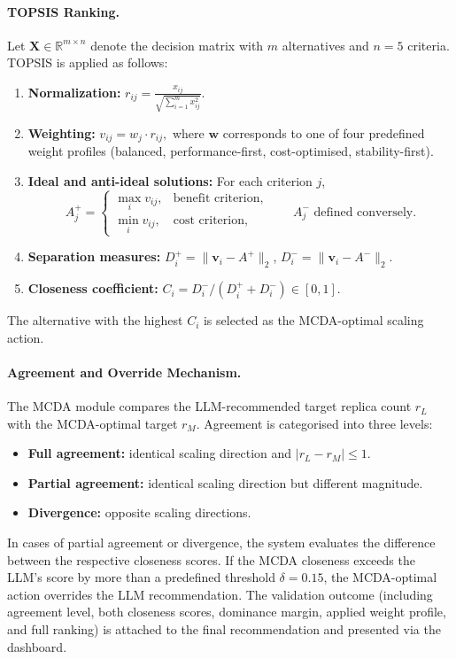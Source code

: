 \documentclass[sigconf]{acmart}
\begin{document}
\paragraph{TOPSIS Ranking.}
Let $\mathbf{X} \in \mathbb{R}^{m \times n}$ denote the decision matrix with $m$ alternatives and $n=5$ criteria. TOPSIS is applied as follows:

\begin{enumerate}
  \item \textbf{Normalization:} $r_{ij} = \frac{x_{ij}}{\sqrt{\sum_{i=1}^{m} x_{ij}^2}}.$
  \item \textbf{Weighting:} $v_{ij} = w_j \cdot r_{ij},$
        where $\mathbf{w}$ corresponds to one of four predefined weight profiles
        (balanced, performance-first, cost-optimised, stability-first).
  \item \textbf{Ideal and anti-ideal solutions:}
        For each criterion $j$,
        \[
        A^{+}_j =
        \begin{cases}
        \max_i v_{ij}, & \text{benefit criterion}, \\
        \min_i v_{ij}, & \text{cost criterion},
        \end{cases}
        \qquad
        A^{-}_j \text{ defined conversely.}
        \]
  \item \textbf{Separation measures:}
        $D^{+}_i = \lVert \mathbf{v}_i - A^{+} \rVert_2$, \; $D^{-}_i = \lVert \mathbf{v}_i - A^{-} \rVert_2$.
  \item \textbf{Closeness coefficient:}
        $C_i = D^{-}_i / (D^{+}_i + D^{-}_i) \in [0,1]$.
\end{enumerate}

The alternative with the highest $C_i$ is selected as the MCDA-optimal scaling action.

\paragraph{Agreement and Override Mechanism.}
The MCDA module compares the LLM-recommended target replica count $r_L$ with the MCDA-optimal target $r_M$. Agreement is categorised into three levels:

\begin{itemize}
  \item \textbf{Full agreement:} identical scaling direction and 
        $|r_L - r_M| \leq 1$.
  \item \textbf{Partial agreement:} identical scaling direction but different magnitude.
  \item \textbf{Divergence:} opposite scaling directions.
\end{itemize}
In cases of partial agreement or divergence, the system evaluates the difference between the respective closeness scores. If the MCDA closeness exceeds the LLM’s score by more than a predefined threshold $\delta = 0.15$, the MCDA-optimal action overrides the LLM recommendation.
The validation outcome (including agreement level, both closeness scores, dominance margin, applied weight profile, and full ranking) is attached to the final recommendation and presented via the dashboard.
\end{document}
